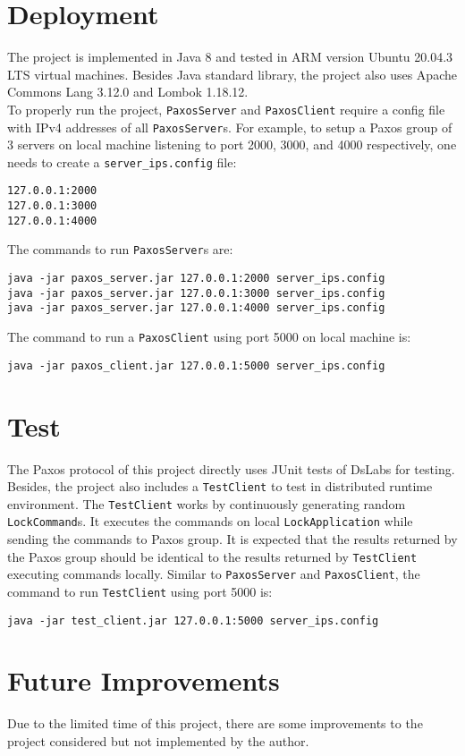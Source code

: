 \documentclass{article}
\numberwithin{equation}{section}
\begin{document}
\section{Deployment}
The project is implemented in Java 8 and tested in ARM version Ubuntu 20.04.3 LTS virtual machines. Besides Java standard library, the project also uses Apache Commons Lang 3.12.0 and Lombok 1.18.12.\\

To properly run the project, \verb|PaxosServer| and \verb|PaxosClient| require a config file with IPv4 addresses of all \verb|PaxosServer|s. For example, to setup a Paxos group of 3 servers on local machine listening to port 2000, 3000, and 4000 respectively, one needs to create a \verb|server_ips.config| file:
\begin{verbatim}
127.0.0.1:2000
127.0.0.1:3000
127.0.0.1:4000
\end{verbatim}
The commands to run \verb|PaxosServer|s are:
\begin{verbatim}
java -jar paxos_server.jar 127.0.0.1:2000 server_ips.config
java -jar paxos_server.jar 127.0.0.1:3000 server_ips.config
java -jar paxos_server.jar 127.0.0.1:4000 server_ips.config
\end{verbatim}
The command to run a \verb|PaxosClient| using port 5000 on local machine is:
\begin{verbatim}
java -jar paxos_client.jar 127.0.0.1:5000 server_ips.config
\end{verbatim}

\section{Test}
The Paxos protocol of this project directly uses JUnit tests of DsLabs for testing. Besides, the project also includes a \verb|TestClient| to test in distributed runtime environment. The \verb|TestClient| works by continuously generating random \verb|LockCommand|s. It executes the commands on local \verb|LockApplication| while sending the commands to Paxos group. It is expected that the results returned by the Paxos group should be identical to the results returned by \verb|TestClient| executing commands locally. Similar to \verb|PaxosServer| and \verb|PaxosClient|, the command to run \verb|TestClient| using port 5000 is:
\begin{verbatim}
java -jar test_client.jar 127.0.0.1:5000 server_ips.config
\end{verbatim}

\section{Future Improvements}
Due to the limited time of this project, there are some improvements to the project considered but not implemented by the author.
\end{document}
